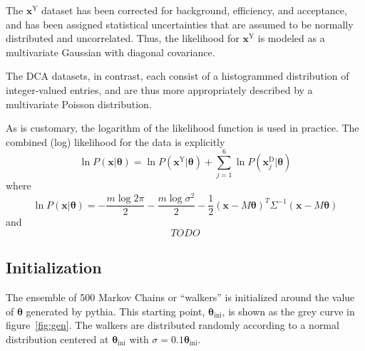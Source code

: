 \documentclass[12pt]{article}
\newcommand{\xvec}{\mathbf{x}}
\newcommand{\thetavec}{\mathbf{\theta}}
\newcommand{\like}{P(\xvec|\thetavec)}
\newcommand{\eptdata}{\xvec^{\mathrm{Y}}}
\newcommand{\dcadata}{\xvec^{\mathrm{D}}_j}
\begin{document}
The $\eptdata$ dataset has been corrected for background, efficiency, and acceptance, and has been assigned statistical uncertainties that are assumed to be normally distributed and uncorrelated. Thus, the likelihood for $\eptdata$ is modeled as a multivariate Gaussian with diagonal covariance.

The DCA datasets, in contrast, each consist of a histogrammed distribution of integer-valued entries, and are thus more appropriately described by a multivariate Poisson distribution.

As is customary, the logarithm of the likelihood function is used in practice. The combined (log) likelihood for the data is explicitly
\begin{equation} \label{eq:logl}
  \ln \like = \ln P(\eptdata|\thetavec) + \sum_{j=1}^6 \ln P(\dcadata|\thetavec)
\end{equation}
where
\begin{equation} \label{eq:llgauss}
  \ln \like = -\frac{m \log 2\pi}{2} - \frac{m \log \sigma^2}{2} - \frac{1}{2} (\xvec - M \thetavec)^T \Sigma^{-1} (\xvec - M \thetavec) 
\end{equation}
and
\begin{equation} \label{eq:llpoiss}
  TODO
\end{equation}

\subsection{Initialization} \label{sec:mcmc-init}
The ensemble of 500 Markov Chains or ``walkers'' is initialized around the value of $\thetavec$ generated by pythia. This starting point, $\thetavec_{\mathrm{ini}}$, is shown as the grey curve in figure~\ref{fig:gen}. The walkers are distributed randomly according to a normal distribution centered at $\thetavec_{\mathrm{ini}}$ with $\sigma = 0.1 \thetavec_{\mathrm{ini}}$.
\end{document}

